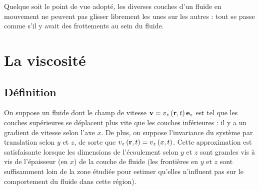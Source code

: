 \documentclass[11pt,a4paper]{report}
\begin{document}
%
%

Quelque soit le point de vue adopté, les diverses couches d'un fluide en mouvement ne peuvent pas glisser librement les unes sur les autres : tout se passe comme s'il y avait des frottements au sein du fluide.

\newpage
\section{La viscosité}\label{sec:1}

\subsection{Définition}\label{sec:1.1}

On suppose un fluide dont le champ de vitesse $\bold{v} = v_z\left(\bold{r},t\right)\bold{e}_z$ est tel que les couches supérieures se déplacent plus vite que les couches inférieures : il y a un gradient de vitesse selon l'axe $x$. De plus, on suppose l'invariance du système par translation selon $y$ et $z$, de sorte que $v_z\left(\bold{r},t\right) = v_z\left(x,t\right)$. Cette approximation est satisfaisante lorsque les dimensions de l'écoulement selon $y$ et $z$ sont grandes vis à vis de l'épaisseur (en $x$) de la couche de fluide (les frontières en $y$ et $z$ sont suffisamment loin de la zone étudiée pour estimer qu'elles n'influent pas sur le comportement du fluide dans cette région).
\end{document}
